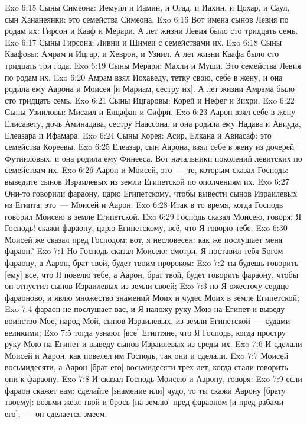 \vs Exo 6:15 Сыны Симеона: Иемуил и Иамин, и Огад, и Иахин, и Цохар, и Саул, сын Хананеянки: это семейства Симеона.
\vs Exo 6:16 Вот имена сынов Левия по родам их: Гирсон и Кааф и Мерари. А лет жизни Левия было сто тридцать семь.
\vs Exo 6:17 Сыны Гирсона: Ливни и Шимеи с семействами их.
\vs Exo 6:18 Сыны Каафовы: Амрам и Ицгар, и Хеврон, и Узиил. А лет жизни Каафа было сто тридцать три года.
\vs Exo 6:19 Сыны Мерари: Махли и Муши. Это семейства Левия по родам их.
\vs Exo 6:20 Амрам взял Иохаведу, тетку свою, себе в жену, и она родила ему Аарона и Моисея [и Мариам, сестру их]. А лет жизни Амрама было сто тридцать семь.
\vs Exo 6:21 Сыны Ицгаровы: Корей и Нефег и Зихри.
\vs Exo 6:22 Сыны Узииловы: Мисаил и Елцафан и Сифри.
\vs Exo 6:23 Аарон взял себе в жену Елисавету, дочь Аминадава, сестру Наассона, и она родила ему Надава и Авиуда, Елеазара и Ифамара.
\vs Exo 6:24 Сыны Корея: Асир, Елкана и Авиасаф: это семейства Кореевы.
\vs Exo 6:25 Елеазар, сын Аарона, взял себе в жену  из дочерей Футииловых, и она родила ему Финееса. Вот начальники поколений левитских по семействам их.
\vs Exo 6:26 Аарон и Моисей, это~--- те, которым сказал Господь: выведите сынов Израилевых из земли Египетской по ополчениям их.
\vs Exo 6:27 Они-то говорили фараону, царю Египетскому, чтобы вывести сынов Израилевых из Египта; это~--- Моисей и Аарон.
\vs Exo 6:28 Итак в то время, когда Господь говорил Моисею в земле Египетской,
\vs Exo 6:29 Господь сказал Моисею, говоря: Я Господь! скажи фараону, царю Египетскому, всё, что Я говорю тебе.
\vs Exo 6:30 Моисей же сказал пред Господом: вот, я несловесен: как же послушает меня фараон?
\vs Exo 7:1 Но Господь сказал Моисею: смотри, Я поставил тебя Богом фараону, а Аарон, брат твой, будет твоим пророком:
\vs Exo 7:2 ты будешь говорить [ему] все, что Я повелю тебе, а Аарон, брат твой, будет говорить фараону, чтобы он отпустил сынов Израилевых из земли своей;
\vs Exo 7:3 но Я ожесточу сердце фараоново, и явлю множество знамений Моих и чудес Моих в земле Египетской;
\vs Exo 7:4 фараон не послушает вас, и Я наложу руку Мою на Египет и выведу воинство Мое, народ Мой, сынов Израилевых, из земли Египетской~--- судами великими;
\vs Exo 7:5 тогда узнают [все] Египтяне, что Я Господь, когда простру руку Мою на Египет и выведу сынов Израилевых из среды их.
\vs Exo 7:6 И сделали Моисей и Аарон, как повелел им Господь, так они и сделали.
\vs Exo 7:7 Моисей  восьмидесяти, а Аарон [брат его] восьмидесяти трех лет, когда стали говорить они к фараону.
\rsbpar\vs Exo 7:8 И сказал Господь Моисею и Аарону, говоря:
\vs Exo 7:9 если фараон скажет вам: сделайте [знамение или] чудо, то ты скажи Аарону [брату твоему]: возьми жезл твой и брось [на землю] пред фараоном [и пред рабами его],~--- он сделается змеем.
